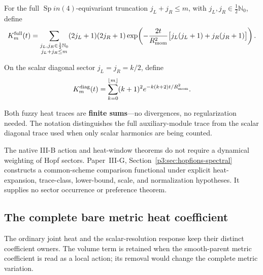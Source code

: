 \documentclass[12pt,a4paper]{article}
\begin{document}
\begin{definition}
For the full \(\operatorname{Sp}in(4)\)-equivariant truncation \(j_L+j_R\le m\), with \(j_L,j_R\in\tfrac12\mathbb N_0\), define
\begin{equation}
K_m^{\rm full}(t)
=
\sum_{\substack{j_L,j_R\in\frac12\mathbb N_0\\ j_L+j_R\le m}}
(2j_L+1)(2j_R+1)
\exp\!\left(
-\frac{2t}{R_{\mathrm{mom}}^2}\bigl[j_L(j_L+1)+j_R(j_R+1)\bigr]
\right).
\end{equation}
\end{definition}

\begin{definition}
On the scalar diagonal sector \(j_L=j_R=k/2\), define
\begin{equation}
K_m^{\rm diag}(t)
=
\sum_{k=0}^{\lfloor m\rfloor}
(k+1)^2 e^{-k(k+2)t/R_{\mathrm{mom}}^2}.
\end{equation}
\end{definition}

Both fuzzy heat traces are \textbf{finite sums}---no divergences, no regularization needed.  The notation distinguishes the full auxiliary-module trace from the scalar diagonal trace used when only scalar harmonics are being counted.

\begin{remark}
The native III-B action and heat-window theorems do not require a dynamical
weighting of Hopf sectors.  Paper~III-G, Section~\ref{p3:sec:hopfions-spectral} constructs
a common-scheme comparison functional under explicit heat-expansion,
trace-class, lower-bound, scale, and normalization hypotheses.  It supplies no
sector occurrence or preference theorem.
\end{remark}

\subsection{The complete bare metric heat coefficient}
\label{p3b:sec:v2216-bare-metric-heat}

The ordinary joint heat and the scalar-resolution response keep their
distinct coefficient owners. The volume term is retained when the
smooth-parent metric coefficient is read as a local action; its removal
would change the complete metric variation.
\end{document}
